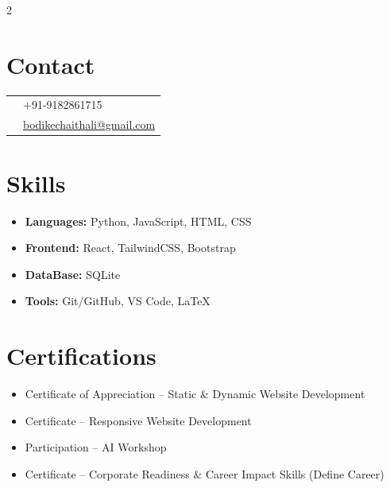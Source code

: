 \documentclass[a4paper,11pt]{article}
\begin{document}
	\begin{paracol}{2}
		\setlength{\columnsep}{1cm}
		
		\switchcolumn
		\section*{Contact}
		\begin{tabular}{@{}rl@{}}
			\faPhone & +91-9182861715 \\
			\faEnvelope & \href{mailto:bodikechaithali@gmail.com}{bodikechaithali@gmail.com} \\
		\end{tabular}
		
		\section*{Skills}
		\begin{itemize}
			\item \textbf{Languages:} Python, JavaScript, HTML, CSS
			\item \textbf{Frontend:} React, TailwindCSS, Bootstrap
			\item \textbf{DataBase:} SQLite
			\item \textbf{Tools:} Git/GitHub, VS Code, \LaTeX
		\end{itemize}
		
		\section*{Certifications}
		\begin{itemize}
			\item Certificate of Appreciation – Static \& Dynamic Website Development
			\item Certificate – Responsive Website Development
			\item Participation – AI Workshop
			\item Certificate – Corporate Readiness \& Career Impact Skills (Define Career)
		\end{itemize}
		

\end{paracol}
\end{document}
